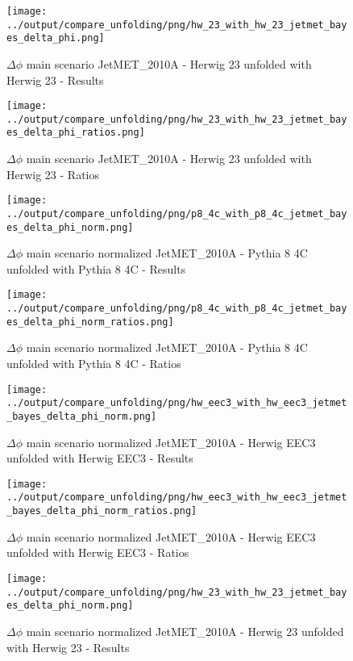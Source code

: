 \documentclass[11pt]{book}
\begin{document}
\begin{figure}[ht]
\centering
\texttt{[image: ../output/compare\_unfolding/png/hw\_23\_with\_hw\_23\_jetmet\_bayes\_delta\_phi.png]}
\caption{$\Delta\phi$ main scenario JetMET\_2010A - Herwig 23 unfolded with Herwig 23 - Results}
\label{hw_23_hw_23_jetmet_delta_phi_a}
\end{figure}

\begin{figure}[ht]
\centering
\texttt{[image: ../output/compare\_unfolding/png/hw\_23\_with\_hw\_23\_jetmet\_bayes\_delta\_phi\_ratios.png]}
\caption{$\Delta\phi$ main scenario JetMET\_2010A - Herwig 23 unfolded with Herwig 23 - Ratios}
\label{hw_23_jetmet_delta_phi_b}
\end{figure}

\begin{figure}[ht]
\centering
\texttt{[image: ../output/compare\_unfolding/png/p8\_4c\_with\_p8\_4c\_jetmet\_bayes\_delta\_phi\_norm.png]}
\caption{$\Delta\phi$ main scenario normalized JetMET\_2010A - Pythia 8 4C unfolded with Pythia 8 4C - Results}
\label{p8_p8_jetmet_delta_phi_norm_a}
\end{figure}

\begin{figure}[ht]
\centering
\texttt{[image: ../output/compare\_unfolding/png/p8\_4c\_with\_p8\_4c\_jetmet\_bayes\_delta\_phi\_norm\_ratios.png]}
\caption{$\Delta\phi$ main scenario normalized JetMET\_2010A - Pythia 8 4C unfolded with Pythia 8 4C - Ratios}
\label{p8_p8_jetmet_delta_phi_norm_b}
\end{figure}

\begin{figure}[ht]
\centering
\texttt{[image: ../output/compare\_unfolding/png/hw\_eec3\_with\_hw\_eec3\_jetmet\_bayes\_delta\_phi\_norm.png]}
\caption{$\Delta\phi$ main scenario normalized JetMET\_2010A - Herwig EEC3 unfolded with Herwig EEC3 - Results}
\label{hw_eec3_hw_eec3_jetmet_delta_phi_norm_a}
\end{figure}

\begin{figure}[ht]
\centering
\texttt{[image: ../output/compare\_unfolding/png/hw\_eec3\_with\_hw\_eec3\_jetmet\_bayes\_delta\_phi\_norm\_ratios.png]}
\caption{$\Delta\phi$ main scenario normalized JetMET\_2010A - Herwig EEC3 unfolded with Herwig EEC3 - Ratios}
\label{hw_eec3_jetmet_delta_phi_norm_b}
\end{figure}

\begin{figure}[ht]
\centering
\texttt{[image: ../output/compare\_unfolding/png/hw\_23\_with\_hw\_23\_jetmet\_bayes\_delta\_phi\_norm.png]}
\caption{$\Delta\phi$ main scenario normalized JetMET\_2010A - Herwig 23 unfolded with Herwig 23 - Results}
\label{hw_23_hw_23_jetmet_delta_phi_norm_a}
\end{figure}
\end{document}
